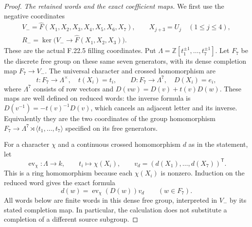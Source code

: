 \begin{proof}
\emph{The retained words and the exact coefficient maps.}
We first use the negative coordinates
\[
 \begin{gathered}
 V_-=\widehat F(X_1,X_2,X_3,X_4,X_5,X_6,X_7),\qquad
 X_{j+3}=U_j\quad(1\leq j\leq4),\\
 R_-=\ker\bigl(V_-\longrightarrow
                     \widehat F(X_1,X_2,X_3)\bigr).
 \end{gathered}                                                \tag{F.24.4}
\]
These are the actual F.22.5 filling coordinates. Put
$\Lambda=\mathbb Z[t_1^{\pm1},\ldots,t_7^{\pm1}]$.
Let $F_7$ be the discrete free group on these same seven
generators, with its dense completion map $F_7\to V_-$.
The universal character and crossed homomorphism are
\[
 t:F_7\longrightarrow\Lambda^\times,\quad t(X_i)=t_i,
 \qquad
 D:F_7\longrightarrow\Lambda^7,\quad D(X_i)=e_i,
                                                               \tag{F.24.5}
\]
where $\Lambda^7$ consists of row vectors and
$D(vw)=D(v)+t(v)D(w)$. These maps are well defined on
reduced words: the inverse formula is
$D(v^{-1})=-t(v)^{-1}D(v)$, which cancels an adjacent
letter and its inverse. Equivalently they are the two
coordinates of the group homomorphism
$F_7\to\Lambda^7\rtimes\langle t_1,\ldots,t_7\rangle$
specified on its free generators.

For a character $\chi$ and a continuous crossed homomorphism
$d$ as in the statement, let
\[
 \operatorname{ev}_\chi:\Lambda\longrightarrow k,
       \qquad t_i\longmapsto\chi(X_i),\qquad
 v_d=(d(X_1),\ldots,d(X_7))^{\mathsf T}.
\]
This is a ring homomorphism because each $\chi(X_i)$ is
nonzero. Induction on the reduced word gives the exact formula
\[
             d(w)=\operatorname{ev}_\chi(D(w))v_d
                      \qquad(w\in F_7).                       \tag{F.24.6}
\]
All words below are finite words in this dense free group,
interpreted in $V_-$ by its stated completion map.
In particular, the calculation does not substitute a
completion of a different source subgroup.


\end{proof}
